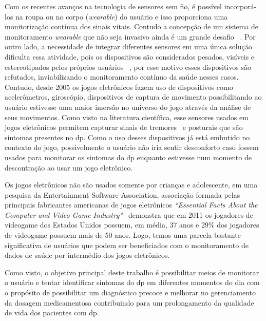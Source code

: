 Com os recentes avanços na tecnologia de sensores sem fio, é possível incorporá-los na roupa ou no corpo (\textit{wearable}) do usuário e isso proporciona uma monitorização contínua dos sinais vitais. Contudo a concepção de um sistema de monitoramento \textit{wearable} que não seja invasivo ainda é um grande desafio ~\cite{alemdar}. Por outro lado, a necessidade de integrar diferentes sensores em uma única solução dificulta essa atividade, pois os dispositivos são considerados pesados, visíveis e estereotipados pelos próprios usuários ~\cite{aarhus_negotiating_2010}, por esse motivo esses dispositivos são refutados, inviabilizando o monitoramento contínuo da saúde nesses casos. Contudo, desde 2005 os jogos eletrônicos fazem uso de dispositivos como acelerômetros, giroscópio, dispositivos de captura de movimento possibilitando ao usuário estivesse uma maior imersão no universo do jogo através da análise de seus movimentos. Como visto na literatura científica, esse sensores usados em jogos eletrônicos permitem 
capturar sinais de tremores~\cite{synnott_wiipd_2012,lemoyne2010} e posturais que são sintomas presentes no \ac{dp}. Como o uso desses dispositivos já está embutido no contexto do jogo, possivelmente o usuário não iria sentir desconforto caso fossem usados para monitorar os sintomas do \ac{dp} enquanto estivesse num momento de descontração ao usar um jogo eletrônico. 

Os jogos eletrônicos não são usados somente por crianças e adolescente, em uma pesquisa da Entertainment Software Association, associação formada pelas principais fabricantes americanas de jogos eletrônicos \textit{``Essential Facts About the Computer and Video Game Industry"}~\cite{esa2011} demonstra que em 2011 os jogadores de videogame dos Estados Unidos possuem, em média, 37 anos e 29$\%$ dos jogadores de videogame possuem mais de 50 anos. Logo, temos uma parcela bastante significativa de usuários que podem ser beneficiados com o monitoramento de dados de saúde por intermédio dos jogos eletrônicos.

Como visto, o objetivo principal deste trabalho é possibilitar meios de monitorar o usuário e tentar identificar sintomas do \ac{dp} em diferentes momentos do dia com o propósito de possibilitar um diagnóstico precoce e melhorar no gerenciamento da dosagem medicamentosa contribuindo para um prolongamento da qualidade de vida dos pacientes com \ac{dp}.

% 
